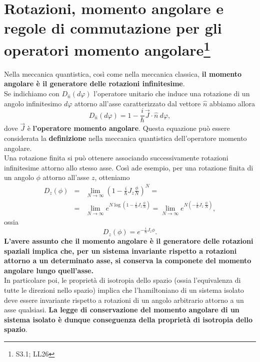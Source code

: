 \documentclass[a4paper,12pt,oneside]{book}
\begin{document}
\section[Rotazioni, momento angolare e regole di commutazione]{Rotazioni, momento angolare e regole di commutazione per gli operatori momento angolare\footnote{S3.1; LL26}}
Nella meccanica quantistica, così come nella meccanica classica, \textbf{il momento angolare è il generatore delle rotazioni infinitesime}.\\
Se indichiamo con $D_{\widehat{n}} (d\varphi)$ l'operatore unitario che induce una rotazione di un angolo infinitesimo $d\varphi$ attorno all'asse caratterizzato dal vettore $\widehat{n}$ abbiamo allora
\begin{equation}
D_{\widehat{n}} (d\varphi)=1-\frac{i}{\hbar}\vec{J}\cdot \widehat{n}\ d\varphi ,
\end{equation}
dove $\vec{J}$ è \textbf{l'operatore momento angolare}. Questa equazione può essere considerata la \textbf{definizione} nella meccanica quantistica dell'operatore momento angolare.\\
Una rotazione finita si può ottenere associando successivamente rotazioni infinitesime attorno allo stesso asse. Così ade esempio, per una rotazione finita di un angolo $\phi$ attorno all'asse $z$, otteniamo
\begin{eqnarray}
D_z (\phi) &=& \lim _{N\rightarrow \infty} \left(1-\frac{i}{\hbar} J_z \frac{\phi}{N}\right) ^N= \nonumber \\
&=& \lim _{N\rightarrow \infty} e^{N\log\left(1-\frac{i}{\hbar} J_z \frac{\phi}{N}\right)}= \lim _{N\rightarrow \infty} e^{N\left(-\frac{i}{\hbar} J_z \ \frac{\phi}{N}\right)},
\end{eqnarray}
ossia
\begin{equation}
D_z (\phi)=e^{-\frac{i}{\hbar} J_z \phi}.
\end{equation}
\textbf{L'avere assunto che il momento angolare è il generatore delle rotazioni spaziali implica che, per un sistema invariante rispetto a rotazioni attorno a un determinato asse, si conserva la componete del momento angolare lungo quell'asse.}\\
In particolare poi, le proprietà di isotropia dello spazio (ossia l'equivalenza di tutte le direzioni nello spazio) implica che l'hamiltoniano di un sistema isolato deve essere invariante rispetto a rotazioni di un angolo arbitrario attorno a un asse qualsiasi. \textbf{La legge di conservazione del momento angolare di un sistema isolato è dunque conseguenza della proprietà di isotropia dello spazio}.\\
\end{document}
